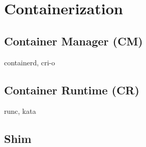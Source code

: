 \section{Containerization}

\subsection{Container Manager (CM)}

containerd, cri-o

\subsection{Container Runtime (CR)}
\label{sec:container-runtime}

runc, kata

\subsection{Shim}
